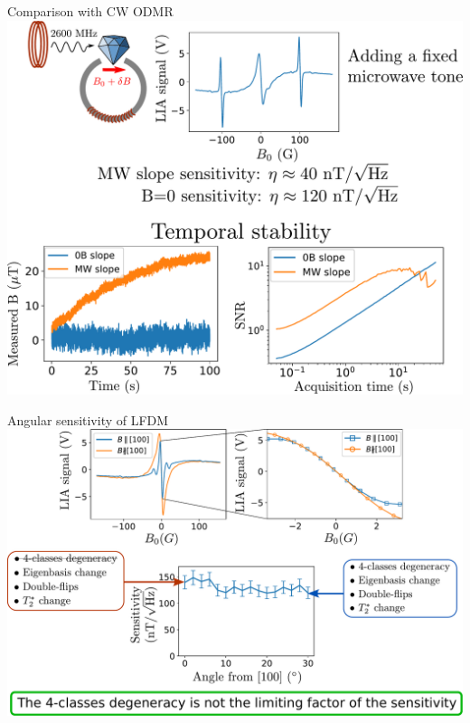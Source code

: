 \documentclass{beamer}
\begin{document}
\begin{frame}{Comparison with CW ODMR}
\centering
\includegraphics[width=\textwidth,height=0.9\textheight,keepaspectratio]{Slide_comparison_microwave}
\end{frame}

\begin{frame}{Angular sensitivity of LFDM}
\centering
\includegraphics[width=\textwidth,height=0.9\textheight,keepaspectratio]{Slide_angular_sensitivity}
\end{frame}
\end{document}
